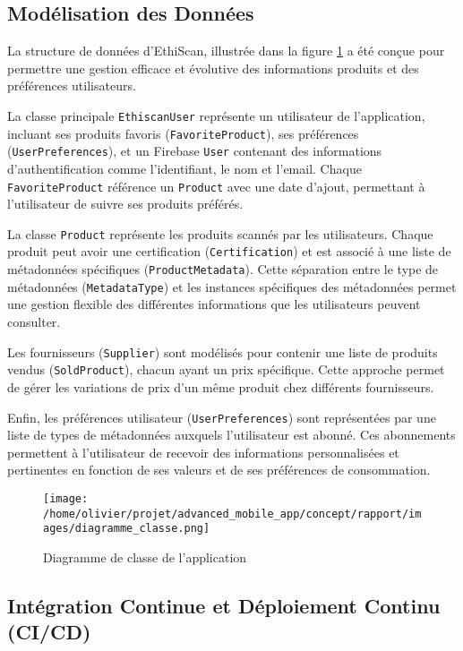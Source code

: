 \subsection{Modélisation des Données}

La structure de données d'EthiScan, illustrée dans la figure \ref{fig:diagramme_classe} a été conçue pour permettre une gestion efficace et évolutive des informations produits et des préférences utilisateurs.

La classe principale \texttt{EthiscanUser} représente un utilisateur de l'application, incluant ses produits favoris (\texttt{FavoriteProduct}), ses préférences (\texttt{UserPreferences}), et un Firebase \texttt{User} contenant des informations d'authentification comme l'identifiant, le nom et l'email. Chaque \texttt{FavoriteProduct} référence un \texttt{Product} avec une date d'ajout, permettant à l'utilisateur de suivre ses produits préférés.

La classe \texttt{Product} représente les produits scannés par les utilisateurs. Chaque produit peut avoir une certification (\texttt{Certification}) et est associé à une liste de métadonnées spécifiques (\texttt{ProductMetadata}). Cette séparation entre le type de métadonnées (\texttt{MetadataType}) et les instances spécifiques des métadonnées permet une gestion flexible des différentes informations que les utilisateurs peuvent consulter.

Les fournisseurs (\texttt{Supplier}) sont modélisés pour contenir une liste de produits vendus (\texttt{SoldProduct}), chacun ayant un prix spécifique. Cette approche permet de gérer les variations de prix d'un même produit chez différents fournisseurs.

Enfin, les préférences utilisateur (\texttt{UserPreferences}) sont représentées par une liste de types de métadonnées auxquels l'utilisateur est abonné. Ces abonnements permettent à l'utilisateur de recevoir des informations personnalisées et pertinentes en fonction de ses valeurs et de ses préférences de consommation.

\begin{figure}[h]
    \centering
    \texttt{[image: /home/olivier/projet/advanced\_mobile\_app/concept/rapport/images/diagramme\_classe.png]}
    \caption{Diagramme de classe de l'application}
    \label{fig:diagramme_classe}
\end{figure}

\subsection{Intégration Continue et Déploiement Continu (CI/CD)}


